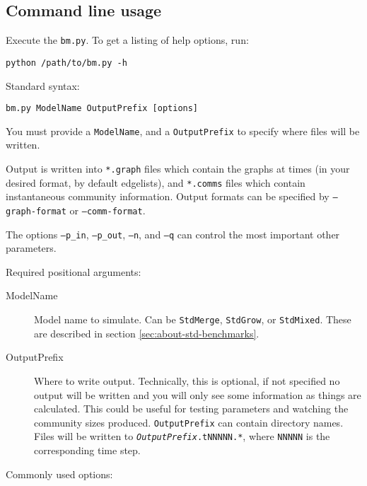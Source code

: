 \documentclass{article}
\def\code#1{\texttt{#1}}
\begin{document}
\subsection{Command line usage}
\label{sec:use-cli}

Execute the \code{bm.py}.  To get a listing of help options, run:

\begin{verbatim}
python /path/to/bm.py -h
\end{verbatim}

Standard syntax:
\begin{verbatim}
bm.py ModelName OutputPrefix [options]
\end{verbatim}
You must provide a \texttt{ModelName}, and a \texttt{OutputPrefix} to
specify where files will be written.

Output is written into \texttt{*.graph} files which contain the graphs
at times (in your desired format, by default edgelists), and
\texttt{*.comms} files which contain instantaneous community
information.  Output formats can be specified by \code{--graph-format}
or \code{--comm-format}.

The options \code{--p\_in}, \code{--p\_out}, \code{--n}, and \code{--q}
can control the most important other parameters.

\vspace{.5cm}

\noindent
Required positional arguments:

\begin{description}
\item[ModelName] Model name to simulate.  Can be \texttt{StdMerge},
  \texttt{StdGrow}, or \texttt{StdMixed}.  These are described
  in section \ref{sec:about-std-benchmarks}.
\item[OutputPrefix] Where to write output.  Technically, this is
  optional, if not specified no output will be written and you will
  only see some information as things are calculated.  This could be
  useful for testing parameters and watching the community sizes produced.
  \texttt{OutputPrefix} can contain directory names.  Files will be
  written to \texttt{\textsl{OutputPrefix}.tNNNNN.*}, where \texttt{NNNNN} is
  the corresponding time step.
\end{description}


\vspace{.5cm}

\noindent
Commonly used options:
\end{document}

